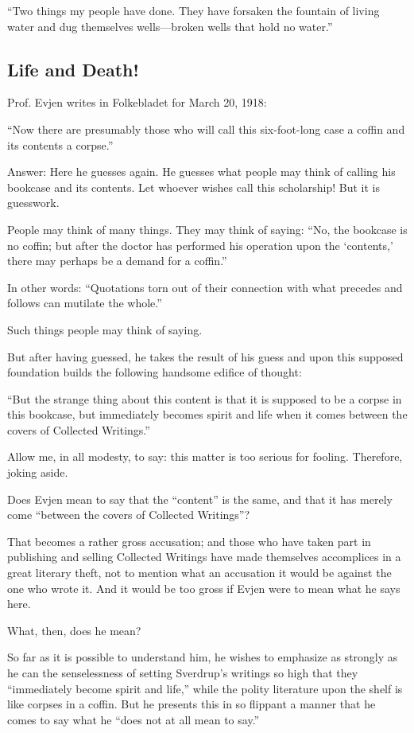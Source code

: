 “Two things my people have done. They have forsaken the fountain of living water and dug themselves wells—broken wells that hold no water.”

\subsection{Life and Death!}

Prof. Evjen writes in Folkebladet for March 20, 1918:

“Now there are presumably those who will call this six-foot-long case a coffin and its contents a corpse.”

Answer: Here he guesses again. He guesses what people may think of calling his bookcase and its contents. Let whoever wishes call this scholarship! But it is guesswork.

People may think of many things. They may think of saying: “No, the bookcase is no coffin; but after the doctor has performed his operation upon the ‘contents,’ there may perhaps be a demand for a coffin.”

In other words: “Quotations torn out of their connection with what precedes and follows can mutilate the whole.”

Such things people may think of saying.

But after having guessed, he takes the result of his guess and upon this supposed foundation builds the following handsome edifice of thought:

“But the strange thing about this content is that it is supposed to be a corpse in this bookcase, but immediately becomes spirit and life when it comes between the covers of Collected Writings.”

Allow me, in all modesty, to say: this matter is too serious for fooling. Therefore, joking aside.

Does Evjen mean to say that the “content” is the same, and that it has merely come “between the covers of Collected Writings”?

That becomes a rather gross accusation; and those who have taken part in publishing and selling Collected Writings have made themselves accomplices in a great literary theft, not to mention what an accusation it would be against the one who wrote it. And it would be too gross if Evjen were to mean what he says here.

What, then, does he mean?

So far as it is possible to understand him, he wishes to emphasize as strongly as he can the senselessness of setting Sverdrup’s writings so high that they “immediately become spirit and life,” while the polity literature upon the shelf is like corpses in a coffin. But he presents this in so flippant a manner that he comes to say what he “does not at all mean to say.”

